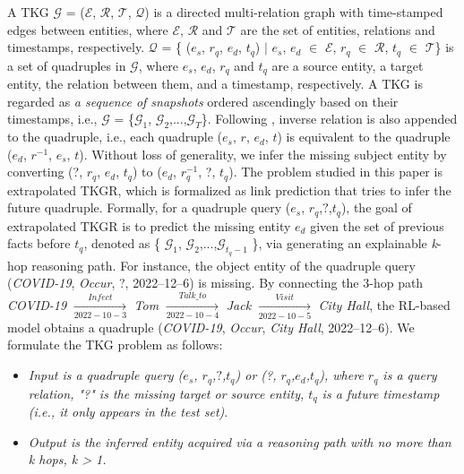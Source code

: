 \documentclass[sigconf,natbib=true]{acmart}
\begin{document}
A TKG $\mathcal{G}$ = ($\mathcal{E}$, $\mathcal{R}$, $\mathcal{T}$, $\mathcal{Q}$) is a directed multi-relation  graph with time-stamped edges between entities, where $\mathcal{E}$, $\mathcal{R}$ and $\mathcal{T}$ are the set of entities, relations and timestamps, respectively. $\mathcal{Q}$ =  \{ (\emph{$e_s$},
\emph{$r_q$}, \emph{$e_d$}, $t_q$) $\mid$ \emph{$e_s$}, \emph{$e_d$} $\in$ $\mathcal{E}$, \emph{$r_q$} $\in$ $\mathcal{R}$, \emph{$t_q$} $\in$  $\mathcal{T}$\} is a set of quadruples in $\mathcal{G}$, where $e_s$, $e_d$, $r_q$ and $t_q$ are a source entity, a target  entity, the relation between them, and a timestamp, respectively. A TKG is regarded as \emph{a sequence of snapshots} ordered ascendingly based on their timestamps, i.e., $\mathcal{G}$ = \{{$\mathcal{G}_1$, $\mathcal{G}_2$,...,$\mathcal{G}_T$}\}. Following \cite{Cluster, TiTer}, inverse relation is also appended to the quadruple, i.e., each quadruple (\emph{$e_s$}, \emph{$r$}, \emph{$e_d$}, $t$) is equivalent to the quadruple (\emph{$e_d$}, \emph{$r^{-1}$}, \emph{$e_s$}, $t$). Without loss of generality, we infer the missing subject entity by converting (?, \emph{$r_q$}, \emph{$e_d$}, $t_q$) to (\emph{$e_d$}, \emph{$r^{-1}_{q}$}, ?, $t_q$). The problem studied in this paper is extrapolated TKGR, which is formalized as link prediction that tries to infer the future quadruple. Formally, for a quadruple query (\emph{$e_s$}, \emph{$r_q$},$?$,\emph{$t_q$}), the goal of extrapolated TKGR is to predict the missing entity \emph{$e_d$} given the set of previous  facts before \emph{$t_q$}, denoted as \{ {$\mathcal{G}_1$, $\mathcal{G}_2$,...,$\mathcal{G}_{t_{q}-1}$} \}, via generating an explainable \emph{k}-hop reasoning path.
For instance, the object entity of the quadruple query (\emph{COVID-19}, \emph{Occur}, ?, 2022--12--6) is missing. By connecting the 3-hop path \emph{COVID-19} $\xrightarrow[2022-10-3]{Infect}$  \emph{Tom} $\xrightarrow[2022-10-4]{Talk\_{to}}$ \emph{Jack} $\xrightarrow[2022-10-5]{Visit}$ \emph{City Hall}, the RL-based model obtains  a quadruple (\emph{COVID-19}, \emph{Occur}, \emph{City Hall}, 2022--12--6). We formulate the TKG problem  as follows:
\begin{itemize}
\item \emph{Input is a quadruple query (\emph{$e_s$}, \emph{$r_q$},$?$,\emph{$t_q$}) or (?, \emph{$r_q$},\emph{$e_d$},\emph{$t_q$}), where $r_q$ is a query  relation, "?" is the missing target or source entity, \emph{$t_q$} is a future timestamp (i.e., it only appears in the test set)}.
\item \emph{Output is the inferred entity acquired via a reasoning path with no more than k hops, k > 1.}
\end{itemize}
\end{document}
